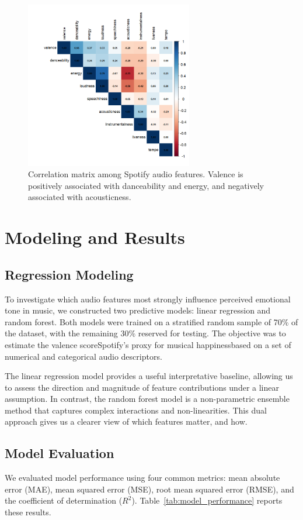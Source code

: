 \documentclass[a4paper,11pt]{article}
\begin{document}
\begin{figure}[h!]
\centering
\includegraphics[width=0.65\textwidth]{Figure5-correlation-matrix.png}
\caption{Correlation matrix among Spotify audio features. Valence is positively associated with danceability and energy, and negatively associated with acousticness.}
\label{fig:corr_matrix}
\end{figure}

\section{Modeling and Results}

\subsection{Regression Modeling}
To investigate which audio features most strongly influence perceived emotional tone in music, we constructed two predictive models: linear regression and random forest. Both models were trained on a stratified random sample of 70\% of the dataset, with the remaining 30\% reserved for testing. The objective was to estimate the valence score\textemdash Spotify’s proxy for musical happiness\textemdash based on a set of numerical and categorical audio descriptors.

The linear regression model provides a useful interpretative baseline, allowing us to assess the direction and magnitude of feature contributions under a linear assumption. In contrast, the random forest model is a non-parametric ensemble method that captures complex interactions and non-linearities. This dual approach gives us a clearer view of which features matter, and how.

\subsection{Model Evaluation}
We evaluated model performance using four common metrics: mean absolute error (MAE), mean squared error (MSE), root mean squared error (RMSE), and the coefficient of determination ($R^2$). Table~\ref{tab:model_performance} reports these results.
\end{document}
